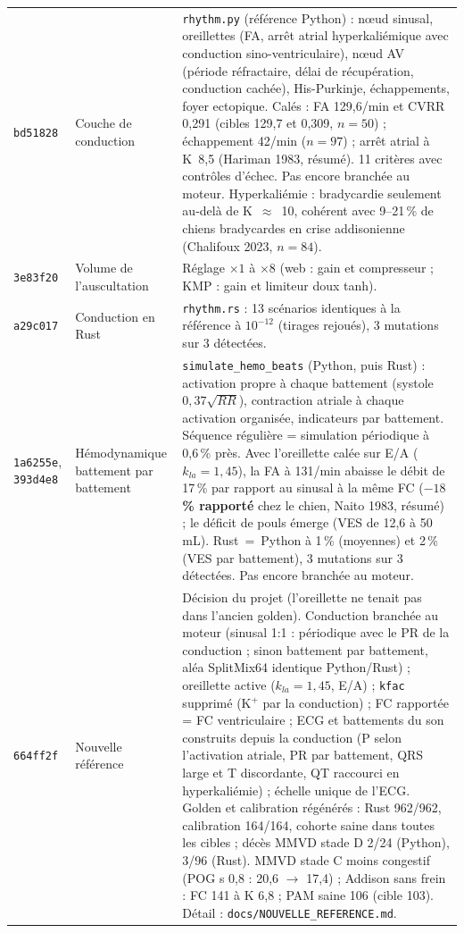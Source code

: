 \documentclass[11pt,a4paper]{article}
\newcommand{\commit}[1]{\texttt{\small #1}}
\newcommand{\ecart}[1]{\textcolor{red!60!black}{#1}}
\begin{document}
\begin{longtable}{@{}p{1.5cm}p{4.2cm}p{10.3cm}@{}}
\commit{bd51828} & Couche de conduction & \texttt{rhythm.py} (référence Python) : nœud sinusal, oreillettes (FA, arrêt atrial hyperkaliémique avec conduction sino-ventriculaire), nœud AV (période réfractaire, délai de récupération, conduction cachée), His-Purkinje, échappements, foyer ectopique. Calés : FA 129,6/min et CVRR 0,291 (cibles 129,7 et 0,309, $n=50$) ; échappement 42/min ($n=97$) ; arrêt atrial à K~8,5 (Hariman 1983, résumé). 11 critères avec contrôles d'échec. Pas encore branchée au moteur. Hyperkaliémie : bradycardie seulement au-delà de K~$\approx$~10, cohérent avec 9--21\,\% de chiens bradycardes en crise addisonienne (Chalifoux 2023, $n=84$).\\
\commit{3e83f20} & Volume de l'auscultation & Réglage $\times1$ à $\times8$ (web : gain et compresseur ; KMP : gain et limiteur doux tanh).\\
\commit{a29c017} & Conduction en Rust & \texttt{rhythm.rs} : 13 scénarios identiques à la référence à $10^{-12}$ (tirages rejoués), 3 mutations sur 3 détectées.\\
\commit{1a6255e}, \commit{393d4e8} & Hémodynamique battement par battement & \texttt{simulate\_hemo\_beats} (Python, puis Rust) : activation propre à chaque battement (systole $0{,}37\sqrt{RR}$), contraction atriale à chaque activation organisée, indicateurs par battement. Séquence régulière = simulation périodique à 0,6\,\% près. Avec l'oreillette calée sur E/A ($k_{la}=1{,}45$), la FA à 131/min abaisse le débit de 17\,\% par rapport au sinusal à la même FC (\textbf{$-18$\,\% rapporté} chez le chien, Naito 1983, résumé) ; le déficit de pouls émerge (VES de 12,6 à 50\,mL). Rust~=~Python à 1\,\% (moyennes) et 2\,\% (VES par battement), 3 mutations sur 3 détectées. Pas encore branchée au moteur.\\
\commit{664ff2f} & Nouvelle référence & Décision du projet (l'oreillette ne tenait pas dans l'ancien golden). Conduction branchée au moteur (sinusal 1:1 : périodique avec le PR de la conduction ; sinon battement par battement, aléa SplitMix64 identique Python/Rust) ; oreillette active ($k_{la}=1{,}45$, E/A) ; \texttt{kfac} supprimé (K$^+$ par la conduction) ; FC rapportée = FC ventriculaire ; ECG et battements du son construits depuis la conduction (P selon l'activation atriale, PR par battement, QRS large et T discordante, QT raccourci en hyperkaliémie) ; échelle unique de l'ECG. Golden et calibration régénérés : Rust 962/962, calibration 164/164, cohorte saine dans toutes les cibles ; décès MMVD stade D 2/24 (Python), 3/96 (Rust). \ecart{MMVD stade C moins congestif (POG s 0,8 : 20,6 $\to$ 17,4) ; Addison sans frein : FC 141 à K 6,8 ; PAM saine 106 (cible 103).} Détail : \texttt{docs/NOUVELLE\_REFERENCE.md}.\\

\end{longtable}
\end{document}
